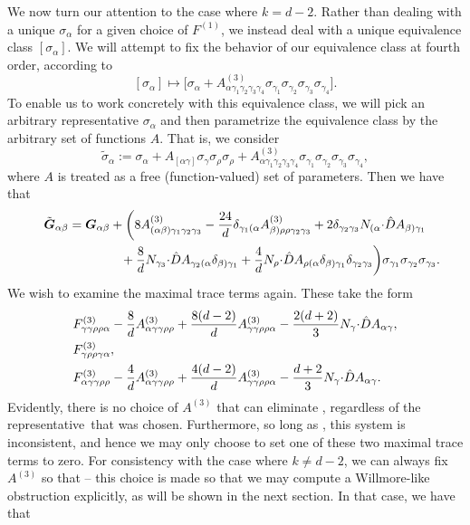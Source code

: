 \documentclass[pdftex]{sigma}
\numberwithin{equation}{section}
\newcommand{\bG}{\boldsymbol{G}}
\newcommand{\hd }{\hat{D}}
\renewcommand{\=}{\stackrel \Lambda =}
\newcommand{\csdot}{\hspace{-0.75mm} \cdot \hspace{-0.75mm}}
\begin{document}
We now turn our attention to the case where $k=d-2$. Rather than dealing with a unique $\sigma_{\alpha}$ for a given choice of $F^{(1)}$, we instead deal with a unique equivalence class $[\sigma_{\alpha}]$. We will attempt to fix the behavior of our equivalence class at fourth order, according to
\[[\sigma_{\alpha}] \mapsto \bigl[\sigma_{\alpha} + A^{(3)}_{\alpha \gamma_1 \gamma_2 \gamma_3 \gamma_4} \sigma_{\gamma_1} \sigma_{\gamma_2} \sigma_{\gamma_3} \sigma_{\gamma_4}\bigr] .\]
To enable us to work concretely with this equivalence class, we will pick an arbitrary representative $\sigma_{\alpha}$ and then parametrize the equivalence class by the arbitrary set of functions $A$. That is, we consider
\[\tilde{\sigma}_{\alpha} := \sigma_{\alpha} + A_{[\alpha \gamma]} \sigma_{\gamma} \sigma_{\rho} \sigma_{\rho} + A^{(3)}_{\alpha \gamma_1 \gamma_2 \gamma_3 \gamma_4} \sigma_{\gamma_1} \sigma_{\gamma_2} \sigma_{\gamma_3} \sigma_{\gamma_4} ,\]
where $A$ is treated as a free (function-valued) set of parameters. Then we have that
\begin{gather*}
\tilde{\bG}_{\alpha \beta} = \bG_{\alpha \beta} +\biggl( 8 A^{(3)}_{(\alpha \beta) \gamma_1 \gamma_2 \gamma_3} - \frac{24}{d} \delta_{\gamma_1 (\alpha} A^{(3)}_{\beta) \rho \rho \gamma_2 \gamma_3} + 2 \delta_{\gamma_2 \gamma_3} N_{(\alpha} \csdot \hd A_{\beta) \gamma_1}\\
\hphantom{\tilde{\bG}_{\alpha \beta} = \bG_{\alpha \beta} +\biggl(}{}
+ \frac{8}{d} N_{\gamma_3} \csdot \hd A_{\gamma_2 (\alpha} \delta_{\beta) \gamma_1} + \frac{4}{d} N_{\rho} \csdot \hd A_{\rho (\alpha} \delta_{\beta) \gamma_1} \delta_{\gamma_2 \gamma_3} \biggr) \sigma_{\gamma_1} \sigma_{\gamma_2} \sigma_{\gamma_3}.
\end{gather*}
We wish to examine the maximal trace terms again. These take the form
\begin{align*}
&F^{(3)}_{\gamma \gamma \rho \rho \alpha }- \frac{8}{d} A^{(3)}_{\alpha \gamma \gamma \rho \rho} + \frac{8(d-2)}{d} A^{(3)}_{\gamma \gamma \rho \rho \alpha} - \frac{2(d+2)}{3} N_{\gamma} \csdot \hd A_{\alpha \gamma} ,\\
& F^{(3)}_{\gamma \rho \rho \gamma \alpha }, \\
&F^{(3)}_{\alpha \gamma \gamma \rho \rho}- \frac{4}{d} A^{(3)}_{\alpha \gamma \gamma \rho \rho} + \frac{4(d-2)}{d} A^{(3)}_{\gamma \gamma \rho \rho \alpha} - \frac{d+2}{3} N_{\gamma} \csdot \hd A_{\alpha \gamma} .
\end{align*}
Evidently, there is no choice of $A^{(3)}$ that can eliminate , regardless of the representative~that was chosen. Furthermore, so long as , this system is inconsistent, and hence we may only choose to set one of these two maximal trace terms to zero. For consistency with the case where $k \neq d-2$, we can always fix $A^{(3)}$ so that  -- this choice is made so that we may compute a Willmore-like obstruction explicitly, as will be shown in the next section. In that case, we have that
\end{document}

